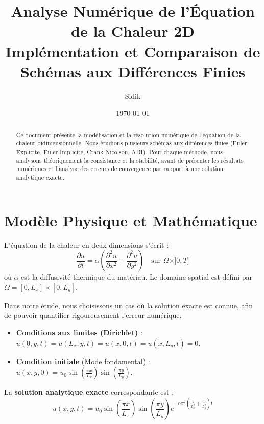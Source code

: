 \documentclass[11pt,a4paper]{article}
\title{\textbf{Analyse Numérique de l'Équation de la Chaleur 2D}\\ \large Implémentation et Comparaison de Schémas aux Différences Finies}
\author{Sidik}
\date{\today}
\begin{document}
\maketitle

\begin{abstract}
Ce document présente la modélisation et la résolution numérique de l'équation de la chaleur bidimensionnelle. Nous étudions plusieurs schémas aux différences finies (Euler Explicite, Euler Implicite, Crank-Nicolson, ADI). Pour chaque méthode, nous analysons théoriquement la consistance et la stabilité, avant de présenter les résultats numériques et l'analyse des erreurs de convergence par rapport à une solution analytique exacte.
\end{abstract}

\tableofcontents
\newpage

\section{Modèle Physique et Mathématique}

L'équation de la chaleur en deux dimensions s'écrit :
\begin{equation}
\frac{\partial u}{\partial t} = \alpha \left( \frac{\partial^2 u}{\partial x^2} + \frac{\partial^2 u}{\partial y^2} \right) \quad \text{sur } \Omega \times ]0, T]
\end{equation}
où $\alpha$ est la diffusivité thermique du matériau. Le domaine spatial est défini par $\Omega = [0, L_x] \times [0, L_y]$.

Dans notre étude, nous choisissons un cas où la solution exacte est connue, afin de pouvoir quantifier rigoureusement l'erreur numérique.
\begin{itemize}
    \item \textbf{Conditions aux limites (Dirichlet)} : $u(0,y,t) = u(L_x,y,t) = u(x,0,t) = u(x,L_y,t) = 0$.
    \item \textbf{Condition initiale} (Mode fondamental) : $u(x,y,0) = u_0 \sin\left(\frac{\pi x}{L_x}\right) \sin\left(\frac{\pi y}{L_y}\right)$.
\end{itemize}

La \textbf{solution analytique exacte} correspondante est :
\begin{equation}
u(x,y,t) = u_0 \sin\left(\frac{\pi x}{L_x}\right) \sin\left(\frac{\pi y}{L_y}\right) e^{-\alpha \pi^2 \left(\frac{1}{L_x^2} + \frac{1}{L_y^2}\right) t}
\end{equation}

\newpage
\end{document}
